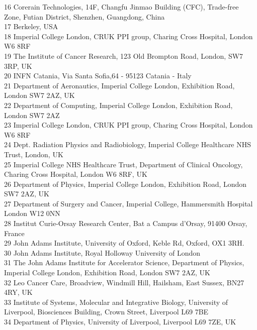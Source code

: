 {\begin{tabbing}
     16 \> Corerain Technologies, 14F, Changfu Jinmao Building (CFC), Trade-free Zone, Futian District, Shenzhen, Guangdong, China\\
     17 \> Berkeley, USA\\
     18 \> Imperial College London, CRUK PPI group, Charing Cross Hospital, London W6 8RF\\
     19 \> The Institute of Cancer Research, 123 Old Brompton Road, London, SW7 3RP, UK\\
     20 \> INFN Catania, Via Santa Sofia,64 - 95123 Catania - Italy\\
     21 \> Department of Aeronautics, Imperial College London, Exhibition Road, London SW7 2AZ, UK\\
     22 \> Department of Computing, Imperial College London, Exhibition Road, London SW7 2AZ\\
     23 \> Imperial College London, CRUK PPI group, Charing Cross Hospital, London W6 8RF\\
     24 \> Dept. Radiation Physics and Radiobiology, Imperial College Healthcare NHS Trust, London, UK\\
     25 \> Imperial College NHS Healthcare Trust, Department of Clinical Oncology, Charing Cross Hospital, London W6 8RF, UK\\
     26 \> Department of Physics, Imperial College London, Exhibition Road, London SW7 2AZ, UK\\
     27 \> Department of Surgery and Cancer, Imperial College, Hammersmith Hospital London W12 0NN\\
     28 \> Institut Curie-Orsay Research Center, Bat a Campus d'Orsay, 91400 Orsay, France\\
     29 \> John Adams Institute, University of Oxford, Keble Rd, Oxford, OX1 3RH.\\
     30 \> John Adams Institute, Royal Holloway University of London\\
     31 \> The John Adams Institute for Accelerator Science, Department of Physics, Imperial College London, Exhibition Road, London SW7 2AZ, UK\\
     32 \> Leo Cancer Care, Broadview, Windmill Hill, Hailsham, East Sussex, BN27 4RY, UK\\
     33 \> Institute of Systems, Molecular and Integrative Biology, University of Liverpool, Biosciences Building, Crown Street, Liverpool L69 7BE\\
     34 \> Department of Physics, University of Liverpool, Liverpool L69 7ZE, UK\\

\end{tabbing}}
